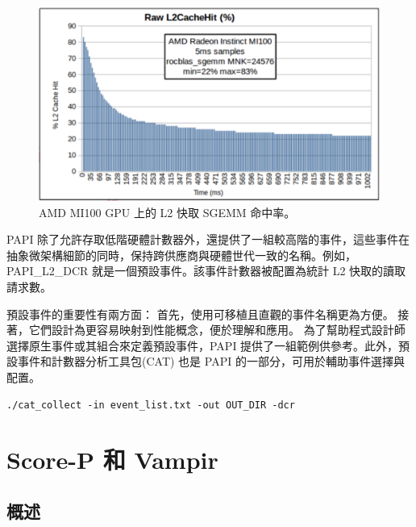 \begin{figure}
    \centering
    \includegraphics[width=0.9\linewidth]{FileAusiliari/Screenshots/Figure13-6.png}
    \caption{AMD MI100 GPU 上的 L2 快取 SGEMM 命中率。}
    \label{fig:PAPI6}
\end{figure}

PAPI 除了允許存取低階硬體計數器外，還提供了一組較高階的事件，這些事件在抽象微架構細節的同時，保持跨供應商與硬體世代一致的名稱。例如，PAPI\_L2\_DCR 就是一個預設事件。該事件計數器被配置為統計 L2 快取的讀取請求數。

預設事件的重要性有兩方面：
首先，使用可移植且直觀的事件名稱更為方便。
接著，它們設計為更容易映射到性能概念，便於理解和應用。
為了幫助程式設計師選擇原生事件或其組合來定義預設事件，PAPI 提供了一組範例供參考。此外，預設事件和計數器分析工具包(CAT) 也是 PAPI 的一部分，可用於輔助事件選擇與配置。





\begin{lstlisting}
./cat_collect -in event_list.txt -out OUT_DIR -dcr
\end{lstlisting}

\section{Score-P 和 Vampir}

\subsection{概述}

